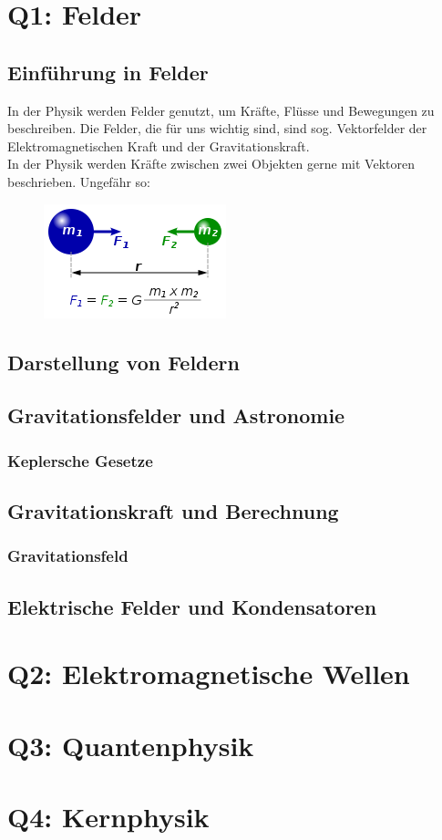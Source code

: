 \documentclass{article}
\begin{document}
    \section{Q1: Felder}

        \subsection{Einführung in Felder}
            In der Physik werden Felder genutzt, um Kräfte, Flüsse und Bewegungen zu beschreiben.
            Die Felder, die für uns wichtig sind, sind sog. Vektorfelder der Elektromagnetischen Kraft
            und der Gravitationskraft. \\
            In der Physik werden Kräfte zwischen zwei Objekten gerne mit Vektoren beschrieben. Ungefähr so:
            \begin{figure}[h]\includegraphics{graphics/universalGravitation.png}\end{figure}          
        \subsection{Darstellung von Feldern}

            

        \subsection{Gravitationsfelder und Astronomie}

            \subsubsection{Keplersche Gesetze}

            \subsection{Gravitationskraft und Berechnung}

            \subsubsection{Gravitationsfeld}

        \subsection{Elektrische Felder und Kondensatoren}

    \section{Q2: Elektromagnetische Wellen}

    \section{Q3: Quantenphysik}

    \section{Q4: Kernphysik}
\end{document}
